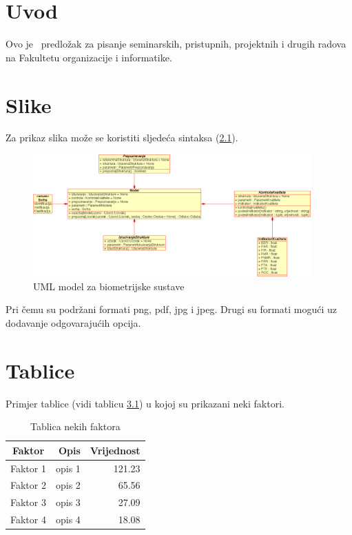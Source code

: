 \documentclass[a4paper,12pt]{foi}
\begin{document}
\maketitle

\tableofcontents

\thispagestyle{empty}

\setcounter{page}{0}

\onehalfspacing

\chapter{Uvod}

Ovo je \LaTeXe\ predlo\v{z}ak za pisanje seminarskih, pristupnih, projektnih i drugih radova na Fakultetu organizacije i informatike.

\chapter{Slike}

Za prikaz slika mo\v{z}e se koristiti sljede\'{c}a sintaksa (\ref{slika-1}).

\begin{figure}[h]
\centering 
\includegraphics[width=0.95\textwidth]{model.png}
\caption{UML model za biometrijske sustave \citep{Schatten2008}}
\label{slika-1}
\end{figure}

Pri \v{c}emu su podr\v{z}ani formati png, pdf, jpg i jpeg. Drugi su formati mogu\'{c}i uz dodavanje odgovaraju\'{c}ih opcija.

\chapter{Tablice}

Primjer tablice (vidi tablicu \ref{tablica-1}) u kojoj su prikazani neki faktori.


\begin{table}[h]
\caption{Tablica nekih faktora}
\begin{center}
\begin{tabular}{||c|r|r||}
\hline
\textbf{Faktor}&\textbf{Opis}&\textbf{Vrijednost} \\
\hline
Faktor 1&opis 1&121.23 \\
Faktor 2&opis 2&65.56 \\
Faktor 3&opis 3&27.09 \\
Faktor 4&opis 4&18.08 \\
\hline
\end{tabular}
\end{center}
\label{tablica-1}
\end{table}
\end{document}
